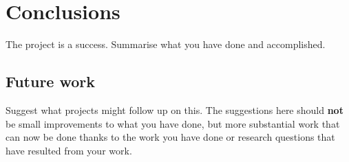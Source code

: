 \chapter{Conclusions}
\label{ch:conclusions}

The project is a success. Summarise what you have done and accomplished.

\section{Future work}

Suggest what projects might follow up on this. The suggestions here should \textbf{not} be small improvements to what you have done, but more substantial work that can now be done thanks to the work you have done or research questions that have resulted from your work.
